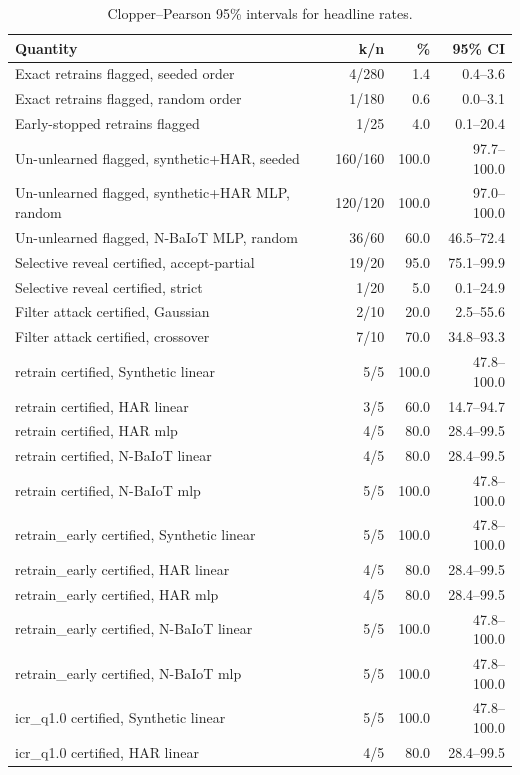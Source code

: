 \begin{table}[h]
\centering
\caption{Clopper--Pearson 95\% intervals for headline rates.}\label{tab:s_ci}
\footnotesize
\setlength{\tabcolsep}{3pt}
\begin{tabular}{@{}lrrr@{}}
\toprule
Quantity & k/n & \% & 95\% CI \\
\midrule
Exact retrains flagged, seeded order & 4/280 & 1.4 & 0.4--3.6 \\
Exact retrains flagged, random order & 1/180 & 0.6 & 0.0--3.1 \\
Early-stopped retrains flagged & 1/25 & 4.0 & 0.1--20.4 \\
Un-unlearned flagged, synthetic+HAR, seeded & 160/160 & 100.0 & 97.7--100.0 \\
Un-unlearned flagged, synthetic+HAR MLP, random & 120/120 & 100.0 & 97.0--100.0 \\
Un-unlearned flagged, N-BaIoT MLP, random & 36/60 & 60.0 & 46.5--72.4 \\
Selective reveal certified, accept-partial & 19/20 & 95.0 & 75.1--99.9 \\
Selective reveal certified, strict & 1/20 & 5.0 & 0.1--24.9 \\
Filter attack certified, Gaussian & 2/10 & 20.0 & 2.5--55.6 \\
Filter attack certified, crossover & 7/10 & 70.0 & 34.8--93.3 \\
retrain certified, Synthetic linear & 5/5 & 100.0 & 47.8--100.0 \\
retrain certified, HAR linear & 3/5 & 60.0 & 14.7--94.7 \\
retrain certified, HAR mlp & 4/5 & 80.0 & 28.4--99.5 \\
retrain certified, N-BaIoT linear & 4/5 & 80.0 & 28.4--99.5 \\
retrain certified, N-BaIoT mlp & 5/5 & 100.0 & 47.8--100.0 \\
retrain\_early certified, Synthetic linear & 5/5 & 100.0 & 47.8--100.0 \\
retrain\_early certified, HAR linear & 4/5 & 80.0 & 28.4--99.5 \\
retrain\_early certified, HAR mlp & 4/5 & 80.0 & 28.4--99.5 \\
retrain\_early certified, N-BaIoT linear & 5/5 & 100.0 & 47.8--100.0 \\
retrain\_early certified, N-BaIoT mlp & 5/5 & 100.0 & 47.8--100.0 \\
icr\_q1.0 certified, Synthetic linear & 5/5 & 100.0 & 47.8--100.0 \\
icr\_q1.0 certified, HAR linear & 4/5 & 80.0 & 28.4--99.5 \\

\end{tabular}
\end{table}

